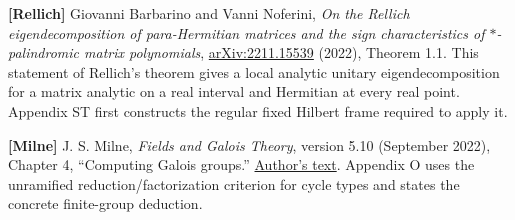 \textbf{{[}Rellich{]}} Giovanni Barbarino and Vanni Noferini, \emph{On the Rellich eigendecomposition of para-Hermitian matrices and the sign characteristics of \(\ast\)-palindromic matrix polynomials}, \href{https://arxiv.org/abs/2211.15539}{arXiv:2211.15539} (2022), Theorem 1.1. This statement of Rellich's theorem gives a local analytic unitary eigendecomposition for a matrix analytic on a real interval and Hermitian at every real point. Appendix ST first constructs the regular fixed Hilbert frame required to apply it.

\textbf{{[}Milne{]}} J. S. Milne, \emph{Fields and Galois Theory}, version 5.10 (September 2022), Chapter 4, ``Computing Galois groups.'' \href{https://www.jmilne.org/math/CourseNotes/FT.pdf}{Author's text}. Appendix O uses the unramified reduction/factorization criterion for cycle types and states the concrete finite-group deduction.

